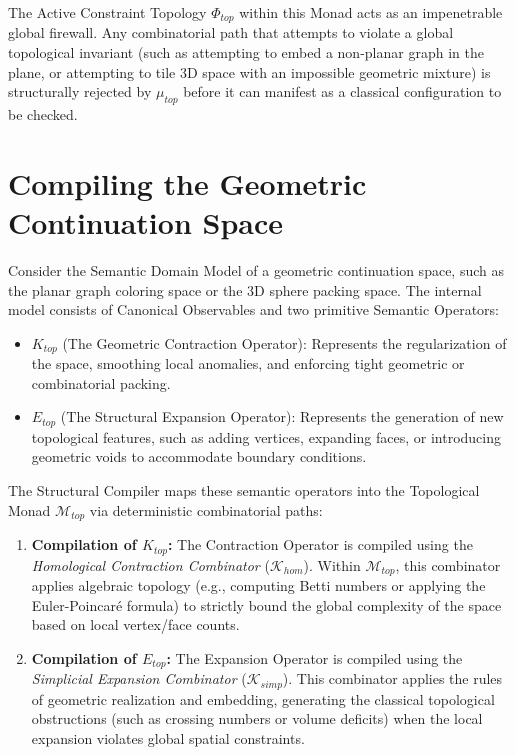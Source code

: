 \documentclass[12pt,openany]{extbook}
\theoremstyle{plain}
\theoremstyle{definition}
\begin{document}
The Active Constraint Topology $\Phi_{top}$ within this Monad acts as an impenetrable global firewall. Any combinatorial path that attempts to violate a global topological invariant (such as attempting to embed a non-planar graph in the plane, or attempting to tile 3D space with an impossible geometric mixture) is structurally rejected by $\mu_{top}$ before it can manifest as a classical configuration to be checked.

\section{Compiling the Geometric Continuation Space}

Consider the Semantic Domain Model of a geometric continuation space, such as the planar graph coloring space or the 3D sphere packing space. The internal model consists of Canonical Observables and two primitive Semantic Operators:
\begin{itemize}
    \item $K_{top}$ (The Geometric Contraction Operator): Represents the regularization of the space, smoothing local anomalies, and enforcing tight geometric or combinatorial packing.
    \item $E_{top}$ (The Structural Expansion Operator): Represents the generation of new topological features, such as adding vertices, expanding faces, or introducing geometric voids to accommodate boundary conditions.
\end{itemize}

The Structural Compiler maps these semantic operators into the Topological Monad $\mathcal{M}_{top}$ via deterministic combinatorial paths:

\begin{enumerate}
    \item \textbf{Compilation of $K_{top}$:} The Contraction Operator is compiled using the \emph{Homological Contraction Combinator} ($\mathcal{K}_{hom}$). Within $\mathcal{M}_{top}$, this combinator applies algebraic topology (e.g., computing Betti numbers or applying the Euler-Poincaré formula) to strictly bound the global complexity of the space based on local vertex/face counts.
    \item \textbf{Compilation of $E_{top}$:} The Expansion Operator is compiled using the \emph{Simplicial Expansion Combinator} ($\mathcal{K}_{simp}$). This combinator applies the rules of geometric realization and embedding, generating the classical topological obstructions (such as crossing numbers or volume deficits) when the local expansion violates global spatial constraints.
\end{enumerate}
\end{document}
